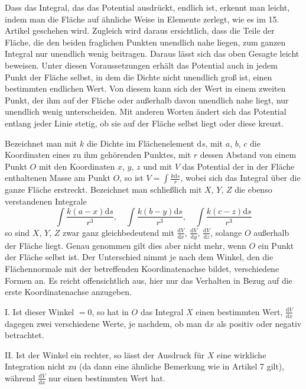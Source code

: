 \expandafter\def\csname HistoricalNoteText22\endcsname{Dass das Integral, das das Potential ausdrückt, endlich ist, erkennt man leicht, indem man die Fläche auf ähnliche Weise in Elemente zerlegt, wie es im 15. Artikel geschehen wird. Zugleich wird daraus ersichtlich, dass die Teile der Fläche, die den beiden fraglichen Punkten unendlich nahe liegen, zum ganzen Integral nur unendlich wenig beitragen. Daraus lässt sich das oben Gesagte leicht beweisen.}%
Unter diesen Voraussetzungen erhält das Potential auch in jedem Punkt der Fläche selbst, in dem die Dichte nicht unendlich groß ist, einen bestimmten endlichen Wert. Von diesem kann sich der Wert in einem zweiten Punkt, der ihm auf der Fläche oder außerhalb davon unendlich nahe liegt, nur unendlich wenig unterscheiden. Mit anderen Worten ändert sich das Potential entlang jeder Linie stetig, ob sie auf der Fläche selbst liegt oder diese kreuzt.

Bezeichnet man mit $k$ die Dichte im Flächenelement $\mathrm{d}s$, mit
%
$a$, $b$, $c$ die Koordinaten eines zu ihm gehörenden Punktes, mit $r$ dessen Abstand von einem Punkt $O$ mit den Koordinaten $x$, $y$, $z$ und mit $V$ das Potential der in der Fläche enthaltenen Masse am Punkt $O$, so ist $V=\int\frac{k\mathrm{d}s}{r}$, wobei sich das Integral über die ganze Fläche erstreckt. Bezeichnet man schließlich mit $X$, $Y$, $Z$ die ebenso verstandenen Integrale
\[
\int\frac{k(a-x)\mathrm{d}s}{r^3},\quad\int\frac{k(b-y)\mathrm{d}s}{r^3},\quad\int\frac{k(c-z)\mathrm{d}s}{r^3}
\]
so sind $X$, $Y$, $Z$ zwar ganz gleichbedeutend mit $\frac{\mathrm{d}V}{\mathrm{d}x}$, $\frac{\mathrm{d}V}{\mathrm{d}y}$, $\frac{\mathrm{d}V}{\mathrm{d}z}$, solange $O$ außerhalb der Fläche liegt. Genau genommen gilt dies aber nicht mehr, wenn $O$ ein Punkt der Fläche selbst ist. Der Unterschied nimmt je nach dem Winkel, den die Flächennormale mit der betreffenden Koordinatenachse bildet, verschiedene Formen an. Es reicht offensichtlich aus, hier nur das Verhalten in Bezug auf die erste Koordinatenachse anzugeben.

I. Ist dieser Winkel $=0$, so hat in $O$ das Integral $X$ einen bestimmten Wert, $\frac{\mathrm{d}V}{\mathrm{d}x}$ dagegen zwei verschiedene Werte, je nachdem, ob man $\mathrm{d}x$ als positiv oder negativ betrachtet.

II. Ist der Winkel ein rechter, so lässt der Ausdruck für $X$ eine wirkliche Integration nicht zu (da dann eine ähnliche Bemerkung wie in Artikel 7 gilt), während $\frac{\mathrm{d}V}{\mathrm{d}x}$ nur einen bestimmten Wert hat.


